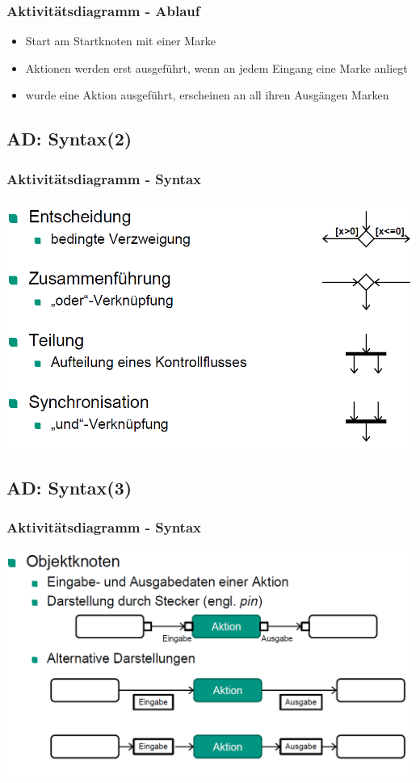 \documentclass[18pt]{beamer}
\begin{document}
	\begin{frame}
	\frametitle{Aktivitätsdiagramm - Ablauf}
	\begin{itemize}
		\item Start am Startknoten mit einer Marke
		\item Aktionen werden erst ausgeführt, wenn an jedem Eingang eine Marke anliegt
		\item wurde eine Aktion ausgeführt, erscheinen an all ihren Ausgängen Marken
	\end{itemize}
	\end{frame}

	\subsection{AD: Syntax(2)}
	\begin{frame}
		\frametitle{Aktivitätsdiagramm - Syntax}
		\includegraphics[scale=0.45]{./pics/tut2/act_syn2.png}
	\end{frame}

	\subsection{AD: Syntax(3)}
	\begin{frame}
		\frametitle{Aktivitätsdiagramm - Syntax}
		\includegraphics[scale=0.45]{./pics/tut2/act_syn3.png}
	\end{frame}
\end{document}
